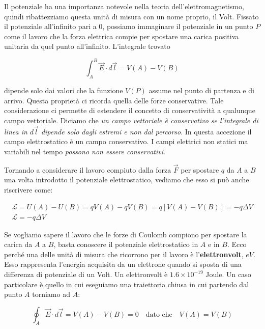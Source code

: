 Il potenziale ha una importanza notevole nella teoria dell'elettromagnetismo, quindi ribattezziamo questa unità di misura con un nome proprio, il Volt. Fissato il potenziale all'infinito pari a $0$, possiamo immaginare il potenziale in un punto $P$ come il lavoro che la forza elettrica compie per spostare una carica positiva unitaria da quel punto all'infinito.
L'integrale trovato

\[
	\boxed{\int_A^B \vec{E} \cdot d\vec{l} = V(A) - V(B)}
\]

dipende solo dai valori che la funzione $V(P)$ assume nel punto di partenza e di arrivo. Questa proprietà ci ricorda quella delle forze conservative. Tale considerazione ci permette di estendere il concetto di conservatività a qualunque campo vettoriale. Diciamo che \emph{un campo vettoriale è conservativo se l'integrale di linea in $d\vec{l}$ dipende solo dagli estremi e non dal percorso}. In questa accezione il campo elettrostatico è un campo conservativo. I campi elettrici non statici ma variabili nel tempo \emph{possono non essere conservativi}.

Tornando a considerare il lavoro compiuto dalla forza $\vec{F}$ per spostare $q$ da $A$ a $B$ una volta introdotto il potenziale elettrostatico, vediamo che esso si può anche riscrivere come:

\begin{gather*}
	\mathcal{L} = U(A) - U(B) = qV(A) - qV(B) = q[V(A)-V(B)] = -q\Delta V \\
	\boxed{\mathcal{L} = - q\Delta V}
\end{gather*}

Se vogliamo sapere il lavoro che le forze di Coulomb compiono per spostare la carica da $A$ a $B$, basta conoscere il potenziale elettrostatico in $A$ e in $B$. Ecco perché una delle unità di misura che ricorrono per il lavoro è l'\textbf{elettronvolt}, $eV$. Esso rappresenta l'energia acquisita da un elettrone quando si sposta di una differenza di potenziale di un Volt. Un elettronvolt è $1.6\times 10^{-19}$ Joule.
Un caso particolare è quello in cui eseguiamo una traiettoria chiusa in cui partendo dal punto $A$ torniamo ad $A$:

\[
	\oint_A \vec{E} \cdot d\vec{l} = V(A) - V(B) = 0 \quad \text{dato che} \quad V(A)=V(B)
\]

